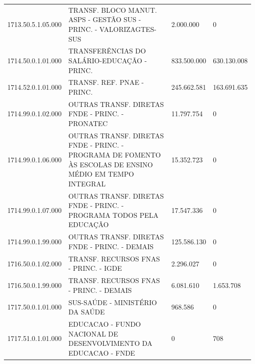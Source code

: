 \documentclass{article}
\begin{document}
\begin{longtable}[c]{m{2cm}|m{11cm}|m{2cm}m{2cm}}
\multicolumn{1}{C{2cm}|}{1713.50.5.1.05.000} & \multicolumn{1}{L{11cm}|}{TRANSF. BLOCO MANUT. ASPS - GESTÃO SUS - PRINC. - VALORIZAGTES-SUS} & \multicolumn{1}{R{2cm}|}{2.000.000} & \multicolumn{1}{R{2cm}}{            0} \\
\multicolumn{1}{C{2cm}|}{1714.50.0.1.01.000} & \multicolumn{1}{L{11cm}|}{TRANSFERÊNCIAS DO SALÁRIO-EDUCAÇÃO - PRINC.} & \multicolumn{1}{R{2cm}|}{833.500.000} & \multicolumn{1}{R{2cm}}{630.130.008} \\
\multicolumn{1}{C{2cm}|}{1714.52.0.1.01.000} & \multicolumn{1}{L{11cm}|}{TRANSF. REF. PNAE - PRINC.} & \multicolumn{1}{R{2cm}|}{245.662.581} & \multicolumn{1}{R{2cm}}{163.691.635} \\
\multicolumn{1}{C{2cm}|}{1714.99.0.1.02.000} & \multicolumn{1}{L{11cm}|}{OUTRAS TRANSF. DIRETAS FNDE - PRINC. - PRONATEC} & \multicolumn{1}{R{2cm}|}{11.797.754} & \multicolumn{1}{R{2cm}}{            0} \\
\multicolumn{1}{C{2cm}|}{1714.99.0.1.06.000} & \multicolumn{1}{L{11cm}|}{OUTRAS TRANSF. DIRETAS FNDE - PRINC. - PROGRAMA DE FOMENTO ÀS ESCOLAS DE ENSINO MÉDIO EM TEMPO INTEGRAL} & \multicolumn{1}{R{2cm}|}{15.352.723} & \multicolumn{1}{R{2cm}}{            0} \\
\multicolumn{1}{C{2cm}|}{1714.99.0.1.07.000} & \multicolumn{1}{L{11cm}|}{OUTRAS TRANSF. DIRETAS FNDE - PRINC. - PROGRAMA TODOS PELA EDUCAÇÃO} & \multicolumn{1}{R{2cm}|}{17.547.336} & \multicolumn{1}{R{2cm}}{            0} \\
\multicolumn{1}{C{2cm}|}{1714.99.0.1.99.000} & \multicolumn{1}{L{11cm}|}{OUTRAS TRANSF. DIRETAS FNDE - PRINC. - DEMAIS} & \multicolumn{1}{R{2cm}|}{125.586.130} & \multicolumn{1}{R{2cm}}{            0} \\
\multicolumn{1}{C{2cm}|}{1716.50.0.1.02.000} & \multicolumn{1}{L{11cm}|}{TRANSF. RECURSOS FNAS - PRINC. - IGDE} & \multicolumn{1}{R{2cm}|}{2.296.027} & \multicolumn{1}{R{2cm}}{            0} \\
\multicolumn{1}{C{2cm}|}{1716.50.0.1.99.000} & \multicolumn{1}{L{11cm}|}{TRANSF. RECURSOS FNAS - PRINC. - DEMAIS} & \multicolumn{1}{R{2cm}|}{6.081.610} & \multicolumn{1}{R{2cm}}{1.653.708} \\
\multicolumn{1}{C{2cm}|}{1717.50.0.1.01.000} & \multicolumn{1}{L{11cm}|}{SUS-SAÚDE - MINISTÉRIO DA SAÚDE} & \multicolumn{1}{R{2cm}|}{968.586} & \multicolumn{1}{R{2cm}}{            0} \\
\multicolumn{1}{C{2cm}|}{1717.51.0.1.01.000} & \multicolumn{1}{L{11cm}|}{EDUCACAO - FUNDO NACIONAL DE DESENVOLVIMENTO DA EDUCACAO - FNDE} & \multicolumn{1}{R{2cm}|}{            0} & \multicolumn{1}{R{2cm}}{708} \\

\end{longtable}
\end{document}
